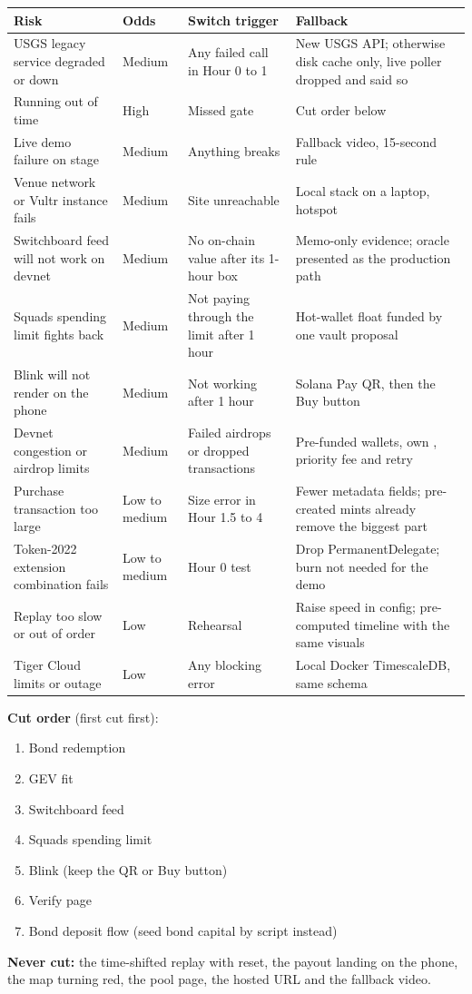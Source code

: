 \documentclass[11pt]{article}
\newcommand{\code}[1]{\texttt{\detokenize{#1}}}
\begin{document}
{\small
\begin{xltabular}{\linewidth}{@{}L{3.6cm} L{1.5cm} L{3.4cm} Y@{}}
\toprule
Risk & Odds & Switch trigger & Fallback \\
\midrule
\endhead
USGS legacy service degraded or down & Medium & Any failed call in Hour 0 to 1 & New USGS API; otherwise disk cache only, live poller dropped and said so \\
Running out of time & High & Missed gate & Cut order below \\
Live demo failure on stage & Medium & Anything breaks & Fallback video, 15-second rule \\
Venue network or Vultr instance fails & Medium & Site unreachable & Local stack on a laptop, hotspot \\
Switchboard feed will not work on devnet & Medium & No on-chain value after its 1-hour box & Memo-only evidence; oracle presented as the production path \\
Squads spending limit fights back & Medium & Not paying through the limit after 1 hour & Hot-wallet float funded by one vault proposal \\
Blink will not render on the phone & Medium & Not working after 1 hour & Solana Pay QR, then the Buy button \\
Devnet congestion or airdrop limits & Medium & Failed airdrops or dropped transactions & Pre-funded wallets, own \code{aUSD}, priority fee and retry \\
Purchase transaction too large & Low to medium & Size error in Hour 1.5 to 4 & Fewer metadata fields; pre-created mints already remove the biggest part \\
Token-2022 extension combination fails & Low to medium & Hour 0 test & Drop PermanentDelegate; burn not needed for the demo \\
Replay too slow or out of order & Low & Rehearsal & Raise speed in config; pre-computed timeline with the same visuals \\
Tiger Cloud limits or outage & Low & Any blocking error & Local Docker TimescaleDB, same schema \\
\bottomrule
\end{xltabular}
}

\textbf{Cut order} (first cut first):
\begin{enumerate}
\item Bond redemption
\item GEV fit
\item Switchboard feed
\item Squads spending limit
\item Blink (keep the QR or Buy button)
\item Verify page
\item Bond deposit flow (seed bond capital by script instead)
\end{enumerate}
\textbf{Never cut:} the time-shifted replay with reset, the payout landing on the phone, the map turning red, the pool page, the hosted URL and the fallback video.
\end{document}
